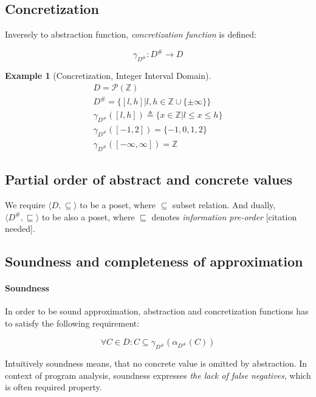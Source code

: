 \documentclass[12pt,oneside]{fithesis2}
\theoremstyle{definition}
\newtheorem{exmp}{Example}[section]
\begin{document}
\subsection{Concretization}
Inversely to abstraction function, \textit{concretization function} is defined: \cite{CousotCousot76-1}

\[
\gamma_{D^\#}\colon D^\# \to D
\]

\begin{exmp}[Concretization, Integer Interval Domain\cite{mine-WING12}]
  \begin{gather*}
    D = \mathcal P(\mathbb Z)\\
    D^\# = \{[l,h] | l,h \in \mathbb{Z} \cup \{\pm\infty\}\}\\
    \gamma_{D^\#}([l,h]) \triangleq \{x \in \mathbb Z | l \le x \le h\}\\
    \gamma_{D^\#}([-1,2]) = \{-1, 0, 1, 2\}\\
    \gamma_{D^\#}([-\infty, \infty]) = \mathbb Z
  \end{gather*}
\end{exmp}

\subsection{Partial order of abstract and concrete values}

We require $\langle D, \subseteq \rangle$ to be a poset, where $\subseteq$ subset relation. And dually, $\langle D^\#, \sqsubseteq \rangle$ to be also a poset, where $\sqsubseteq$ denotes \textit{information pre-order} [citation needed].

\subsection{Soundness and completeness of approximation}

\paragraph{Soundness}
In order to be sound approximation, abstraction and concretization functions has to satisfy the following requirement: \cite{mine-AIAA10}

\[
  \forall C \in D: C \subseteq \gamma_{D^\#}(\alpha_{D^\#}(C))
\]

Intuitively soundness means, that no concrete value is omitted by abstraction. In context of program analysis, soundness expresses \textit{the lack of false negatives}, which is often required property.
\end{document}
